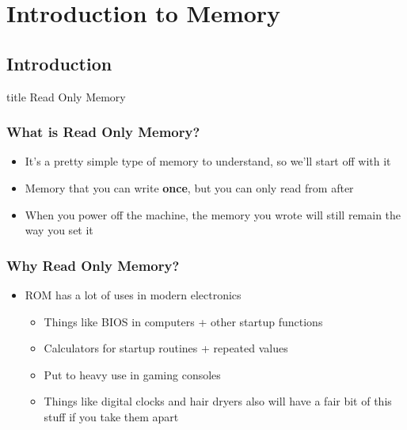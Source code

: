\documentclass{beamer}
\begin{document}
    \section{Introduction to Memory}
    
    	\subsection{Introduction}
    	
    		\begin{frame}
                \vfill
                \centering
                \begin{beamercolorbox}[sep=8pt,center,shadow=true,rounded=true]{title}
                    Read Only Memory\par%
                \end{beamercolorbox}
                \vfill
             \end{frame}
             
             \begin{frame}
             	\frametitle{What is Read Only Memory?}
             	\begin{itemize}
             		\item It's a pretty simple type of memory to understand, so we'll start off with it
             		\item Memory that you can write \textbf{once}, but you can only read from after
             		\item When you power off the machine, the memory you wrote will still remain the way you set it
             		
             	\end{itemize}
             \end{frame}
             
             \begin{frame}
             	\frametitle{Why Read Only Memory?}
             	\begin{itemize}
             		\item ROM has a lot of uses in modern electronics
             		\begin{itemize}
             			\item Things like BIOS in computers + other startup functions
             			\item Calculators for startup routines + repeated values
             			\item Put to heavy use in gaming consoles
             			\item Things like digital clocks and hair dryers also will have a fair bit of this stuff if you take them apart
             		\end{itemize}
             		
             	\end{itemize}
             \end{frame}
             
\end{document}
